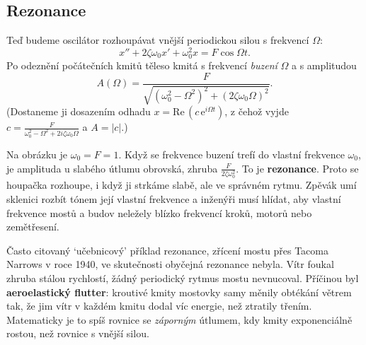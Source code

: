 \subsection{Rezonance}

Teď budeme oscilátor rozhoupávat vnější periodickou silou s frekvencí $\Omega$:
\begin{equation*}
  x'' + 2\zeta\omega_0x' + \omega_0^2x = F\cos\Omega t.
\end{equation*}
Po odeznění počátečních kmitů těleso kmitá s frekvencí \textit{buzení} $\Omega$ a s amplitudou
\begin{equation*}
  A(\Omega) = \frac{F}{\sqrt{{\left(\omega_0^2 - \Omega^2\right)}^2 + {\left(2\zeta\omega_0\Omega\right)}^2}}.
\end{equation*}
(Dostaneme ji dosazením odhadu $x = \mathrm{Re}\,(c\,\mathrm{e}^{i\Omega t})$, z čehož vyjde $c = \frac{F}{\omega_0^2 - \Omega^2 + 2i\zeta\omega_0\Omega}$ a $A = |c|$.)

\begin{center}
\end{center}

Na obrázku je $\omega_0 = F = 1$. Když se frekvence buzení trefí do vlastní frekvence $\omega_0$, je amplituda u slabého útlumu obrovská, zhruba $\frac{F}{2\zeta\omega_0^2}$. To je \textbf{rezonance}. Proto se houpačka rozhoupe, i když ji strkáme slabě, ale ve správném rytmu. Zpěvák umí sklenici rozbít tónem její vlastní frekvence a inženýři musí hlídat, aby vlastní frekvence mostů a budov neležely blízko frekvencí kroků, motorů nebo zemětřesení.

\begin{note}
  Často citovaný `učebnicový' příklad rezonance, zřícení mostu přes Tacoma Narrows v roce 1940, ve skutečnosti obyčejná rezonance nebyla. Vítr foukal zhruba stálou rychlostí, žádný periodický rytmus mostu nevnucoval. Příčinou byl \textbf{aeroelastický flutter}: kroutivé kmity mostovky samy měnily obtékání větrem tak, že jim vítr v každém kmitu dodal víc energie, než ztratily třením. Matematicky je to spíš rovnice se \textit{záporným} útlumem, kdy kmity exponenciálně rostou, než rovnice s vnější silou.
\end{note}

